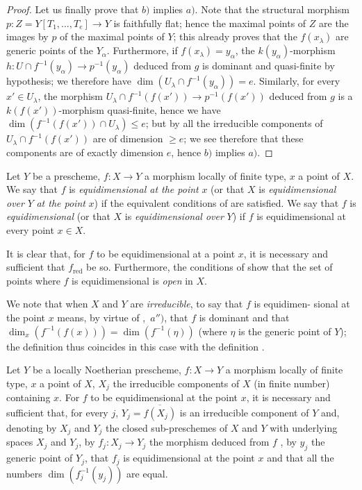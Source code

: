 \begin{proof}
Let us finally prove that $b)$ implies $a)$.
Note that the structural morphism $p:Z=Y[T_1,\ldots,T_e]\to Y$ is faithfully flat; hence  the maximal points of $Z$ are the images by $p$ of the maximal points of $Y$; this already proves that the $f(x_\lambda)$ are generic points of the $Y_\alpha$.
Furthermore, if $f(x_\lambda)=y_\alpha$, the $k(y_\alpha)$-morphism $h:U\cap f^{-1}(y_\alpha)\to p^{-1}(y_\alpha)$ deduced from $g$ is dominant and quasi-finite by hypothesis; we therefore have $\dim(U_\lambda\cap f^{-1}(y_\alpha))=e$.
Similarly, for every $x'\in U_\lambda$, the morphism $U_\lambda\cap f^{-1}(f(x'))\to p^{-1}(f(x'))$ deduced from $g$ is a $k(f(x'))$-morphism quasi-finite, hence  we have $\dim(f^{-1}(f(x'))\cap U_\lambda)\leq e$; but by  all the irreducible components of $U_\lambda\cap f^{-1}(f(x'))$ are of dimension $\geq e$; we see therefore that these components are of exactly dimension $e$, hence $b)$ implies $a)$.
\end{proof}

\begin{definition}[13.3.2]
\label{IV.13.3.2}
Let $Y$ be a prescheme, $f:X\to Y$ a morphism locally of finite type, $x$ a point of $X$.
We say that $f$ is \emph{equidimensional at the point} $x$ (or that $X$ is \emph{equidimensional over} $Y$ \emph{at the point} $x$) if the equivalent conditions of  are satisfied.
We say that $f$ is \emph{equidimensional} (or that $X$ is \emph{equidimensional over} $Y$) if $f$ is equidimensional at every point $x\in X$.
\end{definition}

It is clear that, for $f$ to be equidimensional at a point $x$, it is necessary and sufficient that $f_{\mathrm{red}}$ be so.
Furthermore, the conditions of  show that the set of points where $f$ is equidimensional is \emph{open} in $X$.

We note that when $X$ and $Y$ are \emph{irreducible}, to say that $f$ is equidimen-
sional at the point $x$ means, by virtue of ,~$a'')$, that $f$ is dominant and that $\dim_x(f^{-1}(f(x)))=\dim(f^{-1}(\eta))$ (where $\eta$ is the generic point of $Y$); the definition  thus coincides in this case with the definition .

\begin{proposition}[13.3.3]
\label{IV.13.3.3}
Let $Y$ be a locally Noetherian prescheme, $f:X\to Y$ a morphism locally of finite type, $x$ a point of $X$, $X_j$ the irreducible components of $X$ (in finite number) containing $x$.
For $f$ to be equidimensional at the point $x$, it is necessary and sufficient that, for every $j$, $Y_j=\overline{f(X_j)}$ is an irreducible component of $Y$ and, denoting by $X_j$ and $Y_j$ the closed sub-preschemes of $X$ and $Y$ with underlying spaces $X_j$ and $Y_j$, by $f_j:X_j\to Y_j$ the morphism deduced from $f$ , by $y_j$ the generic point of $Y_j$, that $f_j$ is equidimensional at the point $x$ and that all the numbers $\dim(f_j^{-1}(y_j))$ are equal.
\end{proposition}

